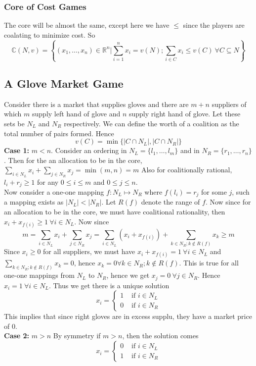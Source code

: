 \documentclass{article}
\theoremstyle{definition}
\begin{document}
\subsubsection{Core of Cost Games}
The core will be almost the same, except here we have $\leq$ since the players are coalating to minimize cost. So $$\mathbb{C}(N,v) = \left\{(x_1,\dots,x_n) \in \mathbb{R}^n | \sum_{i=1}^n x_i = v(N); \sum_{i \in C}x_i \leq v(C)~\forall C\subseteq N\right\}$$
\subsection{A Glove Market Game}
Consider there is a market that supplies gloves and there are $m+n$ suppliers of which $m$ supply left hand of glove and $n$ supply right hand of glove. Let these sets be $N_L$ and $N_R$ respectively. We can define the worth of a coalition as the total number of pairs formed. Hence $$v(C) = \min\{|C\cap N_L|,|C\cap N_R|\}$$
\textbf{Case 1:} $m<n$. Consider an ordering in $N_L = \{l_1,\dots,l_m\}$ and in $N_R = \{r_1,\dots,r_n\}$. Then for the an allocation to be in the core, $\sum_{i \in N_L}x_i + \sum_{j \in N_R} x_j = \min{(m,n)} = m$ Also for coalitionally rational, $l_i + r_j \geq 1$ for any $0\leq i \leq m$ and $0\leq j \leq n$.\\
Now consider a one-one mapping $f:N_L \mapsto N_R$ where $f(l_i) = r_j$ for some $j$, such a mapping exists as $|N_L|<|N_R|$. Let $R(f)$ denote the range of $f$. Now since for an allocation to be in the core, we must have coalitional rationality, then $x_i + x_{f(i)} \geq 1~\forall i \in N_L$. Now since $$m = \sum_{i \in N_L}x_i + \sum_{j \in N_R} x_j = \sum_{i \in N_L} (x_i + x_{f(i)}) + \sum_{k\in N_R;k \notin R(f)}x_k \geq m$$ Since $x_i\geq 0$ for all suppliers, we must have $x_i + x_{f(i)} = 1~\forall i \in N_L$ and $ \sum_{k\in N_R;k \notin R(f)}x_k = 0$, hence $x_k = 0\forall k\in N_R;k \notin R(f)$. This is true for all one-one mappings from $N_L$ to $N_R$, hence we get $x_j = 0~\forall j \in N_R$. Hence $x_i = 1~\forall i \in N_L$. Thus we get there is a unique solution
\[
x_i = 
\begin{cases}
1&\text{ if } i \in N_L\\
0&\text{ if } i \in N_R
\end{cases}
\]
This implies that since right gloves are in excess supplu, they have a market price of $0$.\\
\textbf{Case 2:} $m>n$ By symmetry if $m>n$, then the solution comes 
\[
x_i = 
\begin{cases}
0&\text{ if } i \in N_L\\
1&\text{ if } i \in N_R
\end{cases}
\]
\end{document}
